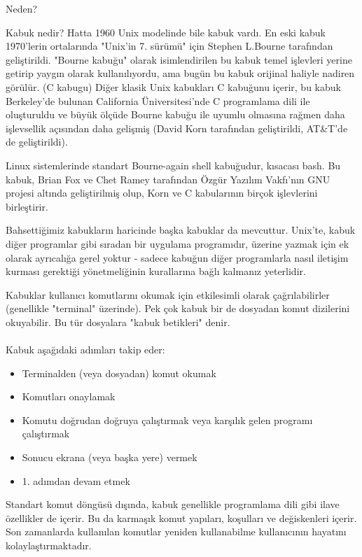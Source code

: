 \documentclass[10pt,a5paper]{book}
\begin{document}
\begin{section}{Neden?}
\begin{subsection}{Kabuk nedir?}
Hatta 1960 Unix modelinde bile kabuk vardı. En eski kabuk 1970'lerin ortalarında "Unix'in 7. sürümü" için Stephen L.Bourne tarafından geliştirildi. "Bourne kabuğu" olarak isimlendirilen bu kabuk temel işlevleri yerine getirip yaygın olarak kullanılıyordu, ama bugün bu kabuk orijinal haliyle nadiren görülür. (C kabugu) Diğer klasik Unix kabukları C kabuğunu içerir, bu kabuk Berkeley'de bulunan California Üniversitesi'nde C programlama dili ile oluşturuldu ve büyük ölçüde Bourne kabuğu ile uyumlu olmasına rağmen daha işlevsellik açısından daha gelişmiş (David Korn tarafından geliştirildi, AT\&T'de de geliştirildi).

Linux sistemlerinde standart Bourne-again shell kabuğudur, kısacası bash. Bu kabuk, Brian Fox ve Chet Ramey tarafından Özgür Yazılım Vakfı'nın GNU projesi altında geliştirilmiş olup, Korn ve C kabularının birçok işlevlerini
birleştirir.

Bahsettiğimiz kabukların haricinde başka kabuklar da mevcuttur. Unix'te, kabuk diğer programlar gibi sıradan bir uygulama programıdır,
üzerine yazmak için ek olarak ayrıcalığa gerel yoktur - sadece kabuğun diğer programlarla nasıl iletişim kurması gerektiği yönetmeliğinin 
kurallarına bağlı kalmanız yeterlidir.

Kabuklar kullanıcı komutlarını okumak için etkilesimli olarak çağrılabilirler (genellikle "terminal" üzerinde). Pek çok kabuk bir de dosyadan komut dizilerini okuyabilir. Bu tür dosyalara "kabuk betikleri" denir.
\paragraph{}{Kabuk aşağıdaki adımları takip eder:
\begin{itemize}
\item Terminalden (veya dosyadan) komut okumak
\item Komutları onaylamak
\item Komutu doğrudan doğruya çalıştırmak veya karşılık gelen programı çalıştırmak
\item Sonucu ekrana (veya başka yere) vermek
\item 1. adımdan devam etmek
\end{itemize}}

Standart komut döngüsü dışında, kabuk genellikle programlama dili gibi ilave özellikler de içerir. Bu da karmaşık komut yapıları, koşulları ve değiskenleri içerir. Son zamanlarda kullanılan komutlar yeniden kullanabilme kullanıcının hayatını kolaylaştırmaktadır.


\end{subsection}
\end{section}
\end{document}
